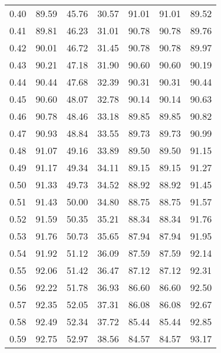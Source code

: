 \begin{tabular}{|c|c|c|c|c|c|c|}
      0.40 &     89.59 &     45.76 &      30.57 &   91.01 &      91.01 &         89.52 \\
      0.41 &     89.81 &     46.23 &      31.01 &   90.78 &      90.78 &         89.76 \\
      0.42 &     90.01 &     46.72 &      31.45 &   90.78 &      90.78 &         89.97 \\
      0.43 &     90.21 &     47.18 &      31.90 &   90.60 &      90.60 &         90.19 \\
      0.44 &     90.44 &     47.68 &      32.39 &   90.31 &      90.31 &         90.44 \\
      0.45 &     90.60 &     48.07 &      32.78 &   90.14 &      90.14 &         90.63 \\
      0.46 &     90.78 &     48.46 &      33.18 &   89.85 &      89.85 &         90.82 \\
      0.47 &     90.93 &     48.84 &      33.55 &   89.73 &      89.73 &         90.99 \\
      0.48 &     91.07 &     49.16 &      33.89 &   89.50 &      89.50 &         91.15 \\
      0.49 &     91.17 &     49.34 &      34.11 &   89.15 &      89.15 &         91.27 \\
      0.50 &     91.33 &     49.73 &      34.52 &   88.92 &      88.92 &         91.45 \\
      0.51 &     91.43 &     50.00 &      34.80 &   88.75 &      88.75 &         91.57 \\
      0.52 &     91.59 &     50.35 &      35.21 &   88.34 &      88.34 &         91.76 \\
      0.53 &     91.76 &     50.73 &      35.65 &   87.94 &      87.94 &         91.95 \\
      0.54 &     91.92 &     51.12 &      36.09 &   87.59 &      87.59 &         92.14 \\
      0.55 &     92.06 &     51.42 &      36.47 &   87.12 &      87.12 &         92.31 \\
      0.56 &     92.22 &     51.78 &      36.93 &   86.60 &      86.60 &         92.50 \\
      0.57 &     92.35 &     52.05 &      37.31 &   86.08 &      86.08 &         92.67 \\
      0.58 &     92.49 &     52.34 &      37.72 &   85.44 &      85.44 &         92.85 \\
      0.59 &     92.75 &     52.97 &      38.56 &   84.57 &      84.57 &         93.17 \\

\end{tabular}
